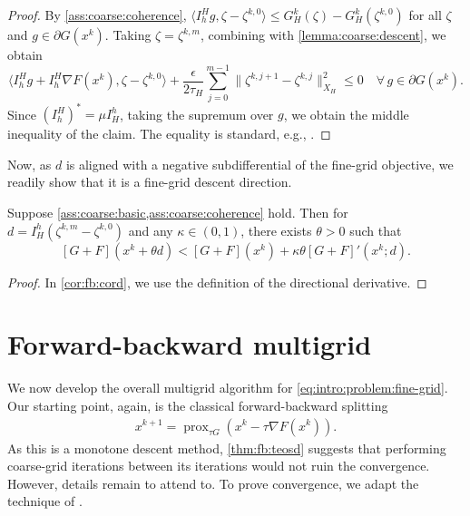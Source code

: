 \documentclass[a4paper,english]{jnsao}
\theoremstyle{definition}
\numberwithin{algorithm}{section}
\newcommand{\proxold}[2]{\prox_{#1}(#2)}
\DeclareMathOperator{\prox}{prox}
\newcommand{\df}[2]{#1 ( #2 )}
\newcommand{\nr}[2]{ \| #1 \|_{#2}}
\newcommand{\pd}[2]{ \langle #1,#2 \rangle}
\begin{document}
\begin{proof}
    By \cref{ass:coarse:coherence},
    $
        \pd{I_h^H g}{\zeta -\zeta ^{k,0}} \leq G_H^k(\zeta)-G_H^k(\zeta^{k,0})
    $
    for all $\zeta$ and $g \in \partial G (x^k)$.
    Taking $\zeta = \zeta^{k,m}$, combining with \cref{lemma:coarse:descent}, we obtain
    \[
        \pd{I_h^H g + I_{h}^{H}\nabla F(x^{k})}{\zeta -\zeta ^{k,0}} +\frac{\epsilon}{2\tau_H}\sum _{j=0}^{m-1}\nr{\zeta^{k,j+1}-\zeta^{k,j}}{X_H}^{2}\leq 0
        \quad \forall\,g \in \partial G (x^k).
    \]
    Since $(I_h^H)^*=\mu I_H^h$, taking the supremum over $g$, we obtain the middle inequality of the claim.
    The equality is standard, e.g., \cite[Lemma 4.4]{clason2020introduction}.
\end{proof}

Now, as $d$ is aligned with a negative subdifferential of the fine-grid objective, we readily show that it is a fine-grid descent direction.

\begin{theorem}
    \label{thm:fb:teosd}
    Suppose \cref{ass:coarse:basic,ass:coarse:coherence} hold.
    Then for $d = I_H^h(\zeta ^{k,m}-\zeta^{k,0})$ and any $\kappa \in (0,1)$, there exists $\theta >0$ such that
    \[
        \label{eq:fb:descent}
        \df{[G+F]}{x^{k}+ \theta d}< \df{[G+F]}{x^{k}}+\kappa\theta \df{{[G+F]}'}{x^{k};d}.
    \]
\end{theorem}

\begin{proof}
    In \cref{cor:fb:cord}, we use the definition of the directional derivative.
\end{proof}

\section{Forward-backward multigrid}
\label{sec:fb}

We now develop the overall multigrid algorithm for \cref{eq:intro:problem:fine-grid}.
Our starting point, again, is the classical forward-backward splitting
\begin{align*}
    x^{k+1} = \proxold{\tau G}{x^k - \tau \nabla F(x^k)}.
\end{align*}
As this is a monotone descent method, \cref{thm:fb:teosd} suggests that performing  coarse-grid iterations between its iterations would not ruin the convergence.
However, details remain to attend to.
To prove convergence, we adapt the technique of \cite{ang2024mgprox}.
\end{document}
